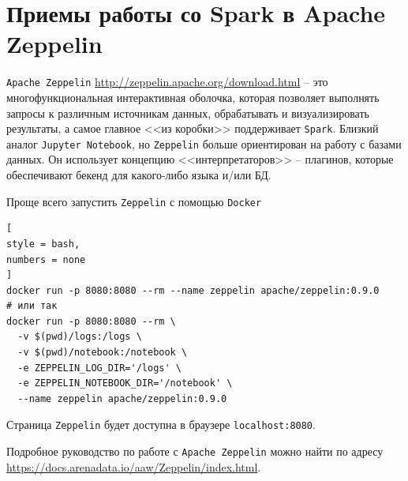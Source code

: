 \documentclass[%
	11pt,
	a4paper,
	utf8,
		]{article}
\begin{document}
\section{Приемы работы со Spark в Apache Zeppelin}

\texttt{Apache Zeppelin} \url{http://zeppelin.apache.org/download.html} -- это многофункциональная интерактивная оболочка, которая позволяет выполнять запросы к различным источникам данных, обрабатывать и визуализировать результаты, а самое главное <<из коробки>> поддерживает \texttt{Spark}. Близкий аналог \texttt{Jupyter Notebook}, но \texttt{Zeppelin} больше ориентирован на работу с базами данных. Он использует концепцию <<интерпретаторов>> -- плагинов, которые обеспечивают бекенд для какого-либо языка и/или БД.

Проще всего запустить \texttt{Zeppelin} с помощью \texttt{Docker}
\begin{lstlisting}[
style = bash,
numbers = none
]
docker run -p 8080:8080 --rm --name zeppelin apache/zeppelin:0.9.0
# или так
docker run -p 8080:8080 --rm \
  -v $(pwd)/logs:/logs \
  -v $(pwd)/notebook:/notebook \
  -e ZEPPELIN_LOG_DIR='/logs' \
  -e ZEPPELIN_NOTEBOOK_DIR='/notebook' \
  --name zeppelin apache/zeppelin:0.9.0
\end{lstlisting}

Страница \texttt{Zeppelin} будет доступна в браузере \texttt{localhost:8080}.

Подробное руководство по работе с \texttt{Apache Zeppelin} можно найти по адресу \url{https://docs.arenadata.io/aaw/Zeppelin/index.html}.




\begin{thebibliography}{99}
\end{thebibliography}

\end{document}
